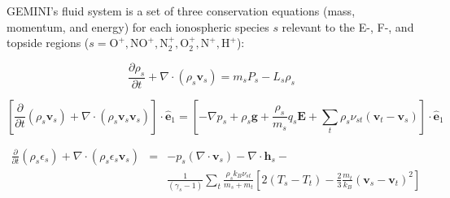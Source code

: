 \documentclass[11pt,letterpaper]{article}
\begin{document}
GEMINI's fluid system is a set of three conservation equations (mass, momentum, and energy) for each ionospheric species $s$ relevant to the E-, F-, and topside regions ($s=\mathrm{O^+,NO^+,N_2^+,O_2^+,N^+,H^+}$):
\begin{linenomath*} \begin{equation}
\frac{\partial \rho_s}{\partial t} + \nabla \cdot \left( \rho_s \mathbf{v}_s \right) = m_s P_s - L_s \rho_s \label{continuity}
\end{equation} \end{linenomath*}
\begin{linenomath*} \begin{equation}
\left[ \frac{\partial }{\partial t} \left( \rho_s \mathbf{v}_s \right) + \nabla \cdot \left( \rho_s \mathbf{v}_s \mathbf{v}_s \right) \right] \cdot \hat{\mathbf{e}}_1 = \left[ -\nabla p_s + \rho_s \mathbf{g} + \frac{\rho_s} {m_s} q_s \mathbf{E} + \sum_t \rho_s \nu_{st} \left(\mathbf{v}_t - \mathbf{v}_s \right) \right] \cdot \hat{\mathbf{e}}_1 \label{momentum}
\end{equation} \end{linenomath*}
\begin{linenomath*} \begin{eqnarray}
\frac{\partial}{\partial t} \left( \rho_s \epsilon_s \right) + \nabla \cdot \left( \rho_s \epsilon_s \mathbf{v}_s \right) &=& - p_s (\nabla \cdot \mathbf{v}_s) - \nabla \cdot \mathbf{h}_s - \nonumber \\
&& \frac{1}{(\gamma_s - 1 )}\sum_t \frac{\rho_s k_B \nu_{st}}{m_s + m_t}\left[ 2 (T_s-T_t) - \frac{2}{3} \frac{m_t}{k_B}(\mathbf{v}_s-\mathbf{v}_t)^2 \right] \label{energy}
\end{eqnarray} \end{linenomath*}
\end{document}
